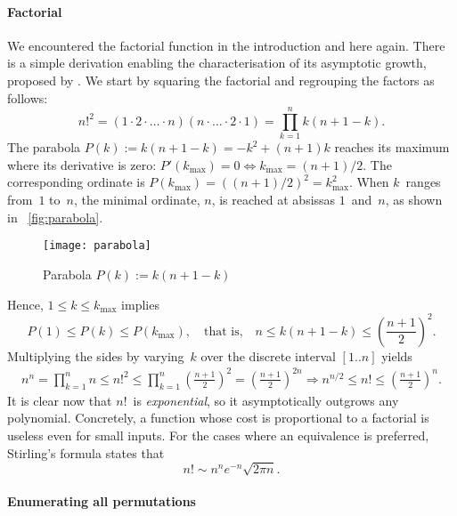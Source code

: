 \paragraph{Factorial}

We encountered the factorial function in the introduction and here
again. There is a simple derivation enabling the characterisation of
its asymptotic growth, proposed by
\cite{GrahamKnuthPatashnik_1994}. We start by squaring the factorial
and regrouping the factors as follows:
\begin{equation*}
n!^2 = (1 \cdot 2 \cdot \ldots \cdot n) (n \cdot \ldots \cdot 2 \cdot
1) = \prod_{k=1}^{n}{k(n+1-k)}.
\end{equation*}
The parabola \(P(k) := k(n+1-k) = -k^2 + (n+1)k\) reaches its maximum
where its derivative is zero: \(P'(k_{\max}) = 0 \Leftrightarrow
k_{\max}=(n+1)/2\). The corresponding ordinate is \(P(k_{\max}) =
((n+1)/2)^2 = k_{\max}^2\). When \(k\)~ranges from~\(1\) to~\(n\), the
minimal ordinate, \(n\), is reached at absissas \(1\)~and~\(n\), as
shown in \fig~\vref{fig:parabola}.
\begin{figure}
\centering
\texttt{[image: parabola]}
\caption{Parabola \(P(k) := k(n+1-k)\)}
\label{fig:parabola}
\end{figure}
Hence, \(1 \leqslant k \leqslant k_{\max}\) implies
\begin{equation*}
P(1) \leqslant P(k) \leqslant P(k_{\max}),\quad \text{that is,} \quad
n \leqslant k(n+1-k) \leqslant \left(\frac{n+1}{2}\right)^2.
\end{equation*}
Multiplying the sides by varying~\(k\) over the discrete interval
\([1..n]\) yields
\begin{gather*}
n^n = \prod_{k=1}^{n}{n} \leqslant n!^2
\leqslant
\prod_{k=1}^{n}{\left(\!\frac{n+1}{2}\!\right)^2} \!\!=
\left(\!\frac{n+1}{2}\!\right)^{2n}
\!\!\!\Rightarrow\!
n^{n/2} \leqslant n! \leqslant \left(\!\frac{n+1}{2}\!\right)^n.
\end{gather*}
It is clear now that \(n!\)~is \emph{exponential}, so it
asymptotically outgrows any polynomial. Concretely, a function whose
cost is proportional to a factorial is useless even for small
inputs. For the cases where an equivalence is preferred, Stirling's
formula states that
\begin{equation}
n! \sim n^n e^{-n} \sqrt{2\pi n}.\label{eq:Stirling}
\end{equation}

\paragraph{Enumerating all permutations}

